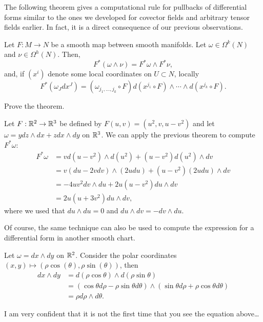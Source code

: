The following theorem gives a computational rule for pullbacks of differential forms similar to the ones we developed for covector fields and arbitrary tensor fields earlier.
In fact, it is a direct consequence of our previous observations.

\begin{theorem}\label{thm:pullbacksdifferentialforms}
  Let $F: M\to N$ be a smooth map between smooth manifolds.
  Let $\omega\in\Omega^k(N)$ and $\nu\in\Omega^h(N)$.
  Then,
  \begin{equation}
    F^*(\omega\wedge\nu) = F^*\omega \wedge F^*\nu,
  \end{equation}
  and, if $(x^i)$ denote some local coordinates on $U\subset N$, locally
  \begin{equation}
    F^*\left(\omega_J dx^J\right) = (\omega_{j_1,\ldots, j_k}\circ F) d(x^{j_1}\circ F)\wedge\cdots\wedge d(x^{j_k}\circ F).
  \end{equation}
\end{theorem}
\begin{exercise}
  Prove the theorem.
\end{exercise}

\begin{example}
  Let $F:\mathbb{R}^2\to\mathbb{R}^3$ be defined by $F(u,v) = (u^2,v,u-v^2)$ and let $\omega = y dz\wedge dx + z dx\wedge dy$ on $\mathbb{R}^3$.
  We can apply the previous theorem to compute $F^*\omega$:
  \begin{align}
    F^*\omega &= v d(u-v^2)\wedge d(u^2) + (u-v^2) d(u^2)\wedge dv \\
    &= v (du-2vdv)\wedge (2 u du) + (u-v^2) (2u du)\wedge dv\\
    &= -4uv^2 dv\wedge du + 2u(u-v^2) du\wedge dv \\
    &= 2u (u + 3v^2) du \wedge dv,
  \end{align}
  where we used that $du\wedge du =0$ and $du\wedge dv = -dv\wedge du$.
\end{example}

Of course, the same technique can also be used to compute the expression for a differential form in another smooth chart.

\begin{example}
  Let $\omega = dx\wedge dy$ on $\mathbb{R}^2$.
  Consider the polar coordinates $(x,y)\mapsto (\rho\cos(\theta),\rho\sin(\theta))$, then
  \begin{align}
    dx\wedge dy &= d(\rho\cos\theta)\wedge d(\rho\sin\theta) \\
    &= (\cos\theta d\rho -\rho\sin\theta d\theta)\wedge (\sin\theta d\rho + \rho\cos\theta d\theta) \\
    &= \rho d\rho\wedge d\theta.
  \end{align}

  I am very confident that it is not the first time that you see the equation above\ldots
\end{example}

